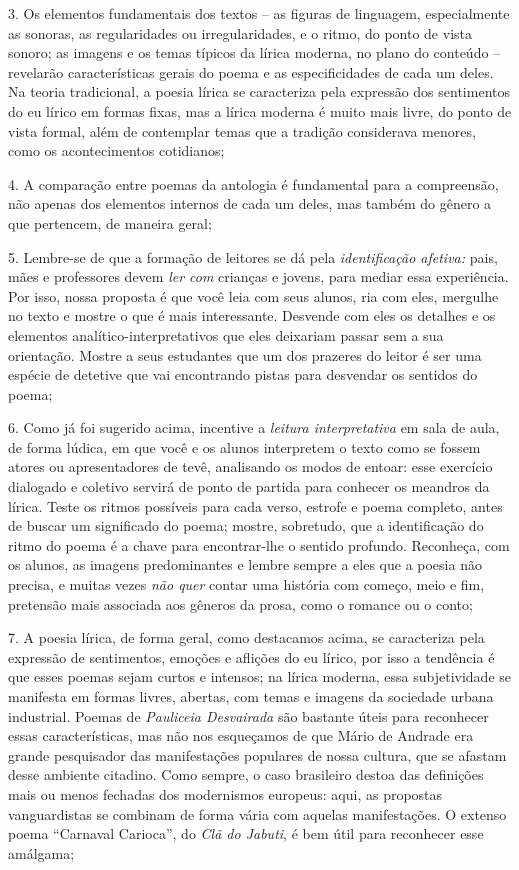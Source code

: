 \documentclass[11pt]{extarticle}
\begin{document}
3. Os elementos fundamentais dos textos -- as figuras de linguagem,
especialmente as sonoras, as regularidades ou irregularidades, e o
ritmo, do ponto de vista sonoro; as imagens e os temas típicos da lírica
moderna, no plano do conteúdo -- revelarão características gerais do
poema e as especificidades de cada um deles. Na teoria tradicional, a
poesia lírica se caracteriza pela expressão dos sentimentos do eu lírico
em formas fixas, mas a lírica moderna é muito mais livre, do ponto de
vista formal, além de contemplar temas que a tradição considerava
menores, como os acontecimentos cotidianos;

4. A comparação entre poemas da antologia é fundamental para a
compreensão, não apenas dos elementos internos de cada um deles, mas
também do gênero a que pertencem, de maneira geral;

5. Lembre-se de que a formação de leitores se dá pela
\emph{identificação afetiva:} pais, mães e professores devem \emph{ler
com} crianças e jovens, para mediar essa experiência. Por isso, nossa
proposta é que você leia com seus alunos, ria com eles, mergulhe no
texto e mostre o que é mais interessante. Desvende com eles os detalhes
e os elementos analítico-interpretativos que eles deixariam passar sem a
sua orientação. Mostre a seus estudantes que um dos prazeres do leitor é
ser uma espécie de detetive que vai encontrando pistas para desvendar os
sentidos do poema;

6. Como já foi sugerido acima, incentive a \emph{leitura interpretativa}
em sala de aula, de forma lúdica, em que você e os alunos interpretem o
texto como se fossem atores ou apresentadores de tevê, analisando os
modos de entoar: esse exercício dialogado e coletivo servirá de ponto de
partida para conhecer os meandros da lírica. Teste os ritmos possíveis
para cada verso, estrofe e poema completo, antes de buscar um
significado do poema; mostre, sobretudo, que a identificação do ritmo do
poema é a chave para encontrar-lhe o sentido profundo. Reconheça, com os
alunos, as imagens predominantes e lembre sempre a eles que a poesia não
precisa, e muitas vezes \emph{não quer} contar uma história com começo,
meio e fim, pretensão mais associada aos gêneros da prosa, como o
romance ou o conto;

7. A poesia lírica, de forma geral, como destacamos acima, se
caracteriza pela expressão de sentimentos, emoções e aflições do eu
lírico, por isso a tendência é que esses poemas sejam curtos e intensos;
na lírica moderna, essa subjetividade se manifesta em formas livres,
abertas, com temas e imagens da sociedade urbana industrial. Poemas de
\emph{Pauliceia Desvairada} são bastante úteis para reconhecer essas
características, mas não nos esqueçamos de que Mário de Andrade era
grande pesquisador das manifestações populares de nossa cultura, que se
afastam desse ambiente citadino. Como sempre, o caso brasileiro destoa
das definições mais ou menos fechadas dos modernismos europeus: aqui, as
propostas vanguardistas se combinam de forma vária com aquelas
manifestações. O extenso poema ``Carnaval Carioca'', do \emph{Clã do
Jabuti}, é bem útil para reconhecer esse amálgama;
\end{document}
